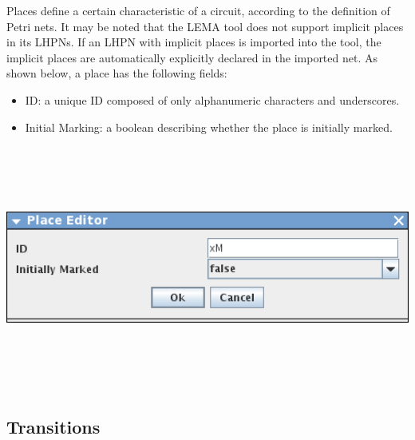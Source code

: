 \documentclass[titlepage,11pt]{article}
\begin{document}
\noindent
Places define a certain characteristic of a circuit, according to the
definition of Petri nets.  It may be noted that the LEMA tool does not support
implicit places in its LHPNs.  If an LHPN with implicit places is imported into
the tool, the implicit places are automatically explicitly declared in the
imported net. 
As shown below, a place has the following fields:
\begin{itemize}
\item ID: a unique ID composed of only alphanumeric characters and 
      underscores.
\item Initial Marking: a boolean describing whether the place is initially marked.
\end{itemize}
\begin{center}
\includegraphics[height=80mm]{screenshots/place}
\end{center}

\subsection{\label{transitions}Transitions}
\end{document}

